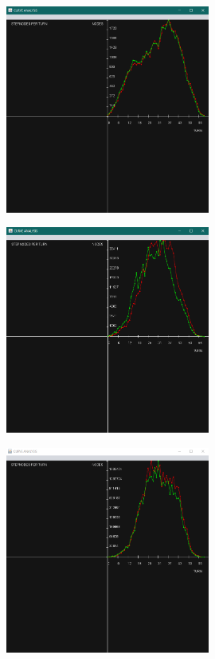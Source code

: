 \begin{figure}[!ht]
\begin{center}
\includegraphics[width=0.60\textwidth]{./STEPNODESPERTURN1}
\end{center}
\end{figure}
\newpage

\begin{figure}[!ht]
\begin{center}
\includegraphics[width=0.60\textwidth]{./STEPNODESPERTURN2}
\end{center}
\end{figure}

\begin{figure}[!ht]
\begin{center}
\includegraphics[width=0.60\textwidth]{./STEPNODESPERTURN3}
\end{center}
\end{figure}

